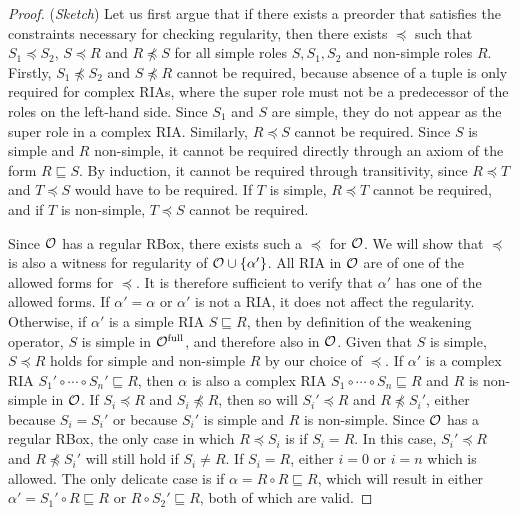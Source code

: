 \begin{proof}(\emph{Sketch}) \label{proof:regularity}
Let us first argue that if there exists a preorder that satisfies the constraints necessary for checking regularity, then there exists $\preceq$ such that $S_1 \preceq S_2$, $S \preceq R$ and $R \not\preceq S$ for all simple roles $S, S_1, S_2$ and non-simple roles $R$. Firstly, $S_1 \not\preceq S_2$ and $S \not\preceq R$ cannot be required, because absence of a tuple is only required for complex RIAs, where the super role must not be a predecessor of the roles on the left-hand side. Since $S_1$ and $S$ are simple, they do not appear as the super role in a complex RIA. Similarly, $R \preceq S$ cannot be required. Since $S$ is simple and $R$ non-simple, it cannot be required directly through an axiom of the form $R \sqsubseteq S$. By induction, it cannot be required through transitivity, since $R \preceq T$ and $T \preceq S$ would have to be required. If $T$ is simple, $R \preceq T$ cannot be required, and if $T$ is non-simple, $T \preceq S$ cannot be required.

Since $\mathcal{O}$ has a regular RBox, there exists such a $\preceq$ for $\mathcal{O}$. We will show that $\preceq$ is also a witness for regularity of $\mathcal{O} \cup \{ \alpha' \}$. All RIA in $\mathcal{O}$ are of one of the allowed forms for $\preceq$. It is therefore sufficient to verify that $\alpha'$ has one of the allowed forms.
If $\alpha' = \alpha$ or $\alpha'$ is not a RIA, it does not affect the regularity.
Otherwise, if $\alpha'$ is a simple RIA $S \sqsubseteq R$, then by definition of the weakening operator, $S$ is simple in ${\mathcal{O}^\textnormal{full}}$, and therefore also in $\mathcal{O}$. Given that $S$ is simple, $S \preceq R$ holds for simple and non-simple $R$ by our choice of $\preceq$.
If $\alpha'$ is a complex RIA $S_1' \circ \cdots \circ S_n' \sqsubseteq R$, then $\alpha$ is also a complex RIA $S_1 \circ \cdots \circ S_n \sqsubseteq R$ and $R$ is non-simple in $\mathcal{O}$. If $S_i \preceq R$ and $S_i \not\preceq R$, then so will $S_i' \preceq R$ and $R \not\preceq S_i'$, either because $S_i = S_i'$ or because $S_i'$ is simple and $R$ is non-simple. Since $\mathcal{O}$ has a regular RBox, the only case in which $R \preceq S_i$ is if $S_i = R$. In this case, $S_i' \preceq R$ and $R \not\preceq S_i'$ will still hold if $S_i \not= R$. If $S_i = R$, either $i = 0$ or $i = n$ which is allowed. The only delicate case is if $\alpha = R \circ R \sqsubseteq R$, which will result in either $\alpha' = S_1' \circ R \sqsubseteq R$ or $R \circ S_2' \sqsubseteq R$, both of which are valid.
\end{proof}

